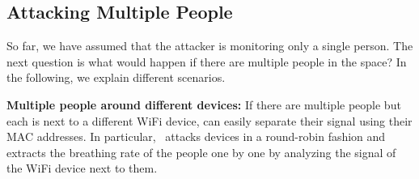 


\subsection{Attacking Multiple People}
\label{sec:multi}
So far, we have assumed that the attacker is monitoring only a single person. The next question is what would happen if there are multiple people in the space? In the following, we explain different scenarios.

\noindent\textbf{Multiple people around different devices:}
If there are multiple people but each is next to a different WiFi device, \wisneak can easily separate their signal using their MAC addresses. In particular, \wisneak\ attacks devices in a round-robin fashion and extracts the breathing rate of the people one by one by analyzing the signal of the WiFi device next to them. 


